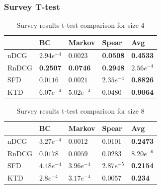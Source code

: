 \begin{frame}
\frametitle{Survey T-test}
\begin{table}[H]
	\centering
	\begin{tabular}{|l|llll|}\hline
		& BC & Markov & Spear & Avg \\ \hline
		nDCG	& $2.94e^{-4}$	& $0.0023$	& \textbf{0.0508}	& \textbf{0.4533} \\
		RnDCG	& \textbf{0.2507}	& \textbf{0.0746}	& \textbf{0.2948}	& $2.56e^{-4}$ \\
		SFD	& $0.0116$	& $0.0021$ 	& $2.35e^{-4}$	& \textbf{0.8826} \\
		KTD	& $6.07e^{-4}$	& $5.02e^{-4}$ 	& $0.0480$	& \textbf{0.9064} \\ \hline
	\end{tabular}
	\caption{Survey results t-test comparison for size 4}
\end{table}

\begin{table}[H]
	\centering
	\begin{tabular}{|l|llll|}\hline
		& BC & Markov & Spear & Avg \\ \hline
		nDCG	& $3.27e^{-4}$	& $0.0012$	& $0.0101$	& \textbf{0.2473} \\
		RnDCG	& $0.0178$	& $0.0059$	& $0.0283$	& $8.20e^{-6}$ \\
		SFD	& $4.48e^{-4}$	& $3.96e^{-4}$ 	& $2.87e^{-5}$	& \textbf{0.2154} \\
		KTD	& $2.8e^{-4}$	& $3.17e^{-4}$ 	& $0.0057$	& \textbf{0.234} \\ \hline
	\end{tabular}
	\caption{Survey results t-test comparison for size 8}
\end{table}
\end{frame}